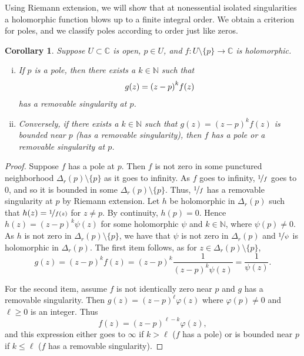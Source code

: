 \documentclass[12pt,openany]{book}
\newcommand{\avoidbreak}{\postdisplaypenalty=100}
\newcommand{\C}{{\mathbb{C}}}
\newcommand{\N}{{\mathbb{N}}}
\theoremstyle{plain}
\newtheorem{cor}[thm]{Corollary}
\theoremstyle{remark}
\theoremstyle{definition}
\theoremstyle{exercise}
\theoremstyle{example}
\begin{document}
Using Riemann extension, we will show that
at nonessential isolated singularities
a holomorphic function blows up to a finite integral order.
We obtain a criterion for poles, and we classify
poles according to order just like zeros.

\begin{cor}
\pagebreak[2]
Suppose $U \subset \C$ is open, $p \in U$,
and $f \colon U \setminus \{p\} \to \C$ is holomorphic.
\begin{enumerate}[(i)]
\item
If $p$ is a pole, then there exists a $k \in \N$ such that
\begin{equation*}
g(z) = {(z-p)}^k f(z)
\avoidbreak
\end{equation*}
has a removable singularity at $p$.
\item
Conversely, if there exists a $k \in \N$ such that
$g(z) = {(z-p)}^k f(z)$ is bounded near $p$ (has a removable singularity),
then $f$ has a pole or a
removable singularity at $p$.
\end{enumerate}
\end{cor}

\begin{proof}
Suppose $f$ has a pole at $p$.
Then $f$ is not zero in some
punctured neighborhood $\Delta_r(p) \setminus \{p\}$ as it goes to infinity.
As $f$ goes to infinity,
$\nicefrac{1}{f}$ goes to $0$, and so it is bounded in some $\Delta_r(p)
\setminus \{p\}$.
Thus, $\nicefrac{1}{f}$ has a removable singularity at $p$ by Riemann extension.
Let $h$ be holomorphic in $\Delta_r(p)$
such that $h(z) = \nicefrac{1}{f(z)}$ for $z \neq p$.  By continuity, $h(p) =
0$.  Hence $h(z) = {(z-p)}^k \psi(z)$ for some holomorphic $\psi$ and $k \in \N$,
where $\psi(p) \neq 0$.
As $h$ is not zero in $\Delta_r(p) \setminus \{p\}$,
we have that $\psi$ is not zero in $\Delta_r(p)$
and $\nicefrac{1}{\psi}$ is holomorphic in $\Delta_r(p)$.
The first item follows, as
for $z \in \Delta_r(p) \setminus \{p\}$,
\begin{equation*}
g(z) = {(z-p)}^k f(z)
=
{(z-p)}^k \frac{1}{{(z-p)}^k \psi(z)}
=
\frac{1}{\psi(z)} .
\end{equation*}

For the second item,
assume $f$ is not identically zero near $p$
and
$g$ has a removable
singularity.
Then $g(z) = {(z-p)}^\ell \varphi(z)$ where
$\varphi(p) \neq 0$ and $\ell \geq 0$ is an integer.
Thus
\begin{equation*}
f(z) = {(z-p)}^{\ell-k} \varphi(z) ,
\end{equation*}
and this expression either goes to $\infty$ if $k > \ell$ ($f$ has a pole) or is
bounded near $p$ if $k \leq \ell$ ($f$ has a removable singularity).
\end{proof}
\end{document}

